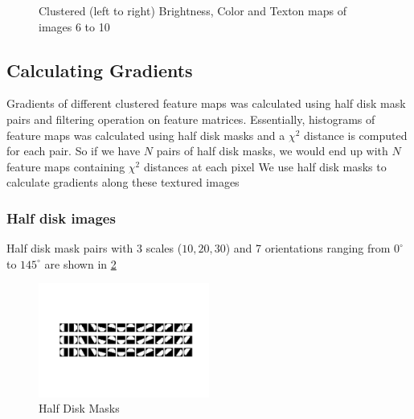 \documentclass[conference]{IEEEtran}
\begin{document}
\begin{figure}
			
			
			\caption{Clustered (left to right) Brightness, Color and Texton maps of images 6 to 10}
			\label{fig:clustered maps 6 to 10}
		\end{figure}

		\subsection{Calculating Gradients}
		Gradients of different clustered feature maps was calculated using half disk mask pairs and filtering operation on feature matrices. Essentially, histograms of feature maps was calculated using half disk masks and a $\chi^2$ distance is computed for each pair. So if we have $N$ pairs of half disk masks, we would end up with $N$ feature maps containing $\chi^2$ distances at each pixel
		We use half disk masks to calculate gradients along these textured images
		\subsubsection{Half disk images}
		Half disk mask pairs with 3 scales ($10,20,30$) and 7 orientations ranging from $0^{\circ}$ to $145^{\circ}$ are shown in \ref{fig:half disk masks}

		\begin{figure}
			\centering
			\captionsetup{justification=centering}
			\includegraphics[width=0.5\textwidth]{filter_banks/HDMasks.png}
			\caption{Half Disk Masks}
			\label{fig:half disk masks}
		\end{figure}
\end{document}
